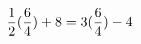 \documentclass[preview]{standalone}
\begin{document}
\begin{align*}
\special{dvisvgm:raw <g id='unique000'>}\frac{1}{2} (\frac{6}{4}) + 8 = 3(\frac{6}{4}) - 4\special{dvisvgm:raw </g>}
\end{align*}
\end{document}
